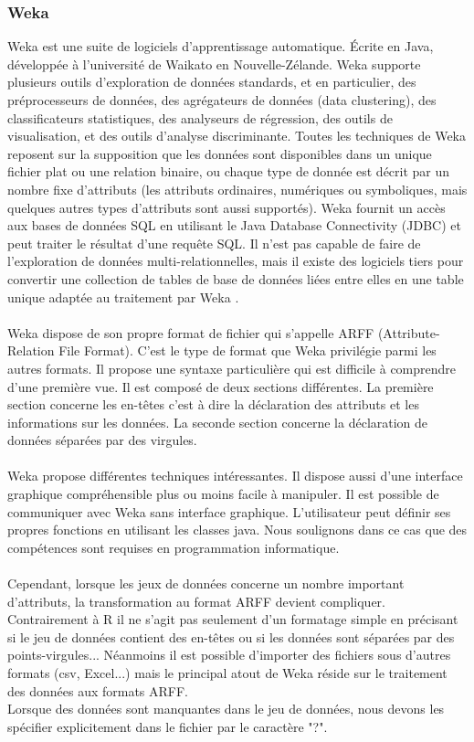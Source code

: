 \documentclass[11pt,a4paper]{report}
\begin{document}
\subsubsection{Weka}
Weka est une suite de logiciels d'apprentissage automatique. Écrite en Java, développée à l'université de Waikato en Nouvelle-Zélande.
Weka supporte plusieurs outils d'exploration de données standards, et en particulier, des préprocesseurs de données, des agrégateurs de données (data clustering), des classificateurs statistiques, des analyseurs de régression, des outils de visualisation, et des outils d'analyse discriminante. Toutes les techniques de Weka reposent sur la supposition que les données sont disponibles dans un unique fichier plat ou une relation binaire, ou chaque type de donnée est décrit par un nombre fixe d'attributs (les attributs ordinaires, numériques ou symboliques, mais quelques autres types d'attributs sont aussi supportés). Weka fournit un accès aux bases de données SQL en utilisant le Java Database Connectivity (JDBC) et peut traiter le résultat d'une requête SQL. Il n'est pas capable de faire de l'exploration de données multi-relationnelles, mais il existe des logiciels tiers pour convertir une collection de tables de base de données liées entre elles en une table unique adaptée au traitement par Weka \cite{weka}. \\\\
Weka dispose de son propre format de fichier qui s'appelle ARFF (Attribute-Relation File Format). C'est le type de format que Weka privilégie parmi les autres formats. Il propose une syntaxe particulière qui est difficile à comprendre d'une première vue. Il est composé de deux sections différentes. La première section concerne les en-têtes c'est à dire la déclaration des attributs et les informations sur les données. La seconde section concerne la déclaration de données séparées par des virgules.\\\\ 
Weka propose différentes techniques intéressantes. Il dispose aussi d'une interface graphique compréhensible plus ou moins facile à manipuler. Il est possible de communiquer avec Weka sans interface graphique. L'utilisateur peut définir ses propres fonctions en utilisant les classes java. Nous soulignons dans ce cas que  des compétences sont requises en programmation informatique. \\\\
Cependant, lorsque les jeux de données concerne un nombre important d'attributs, la transformation au format ARFF devient compliquer. Contrairement à R il ne s'agit pas seulement d'un formatage simple en précisant si le jeu de données contient des en-têtes ou si les données sont séparées par des points-virgules... Néanmoins il est possible d'importer des fichiers sous d'autres formats (csv, Excel...) mais le principal atout de Weka réside sur le traitement des données aux formats ARFF. \\
Lorsque des données sont manquantes dans le jeu de données, nous devons les spécifier explicitement dans le fichier par le caractère "?". 
\end{document}
